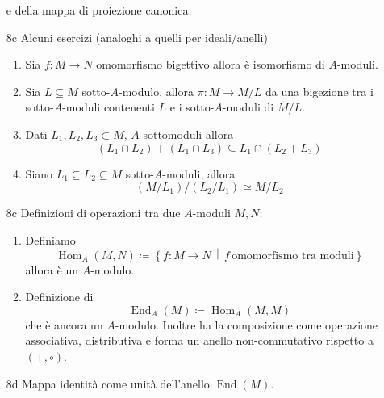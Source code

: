 \documentclass[italian]{article}
\begin{document}
\begin{enumerate}
        e della mappa di proiezione canonica.
      \item[8c] Alcuni esercizi (analoghi a quelli per ideali/anelli)
        \begin{enumerate}
            \item Sia $f \colon M \to N$ omomorfismo bigettivo allora
                è isomorfismo di $A$-moduli.
            \item Sia $L \subseteq M$ sotto-$A$-modulo, allora $\pi : M \to M/L$ da
                una bigezione tra i sotto-$A$-moduli contenenti $L$ e i 
                sotto-$A$-moduli di $M/L$.
            \item Dati $L_1,L_2,L_3 \subset M$, $A$-sottomoduli allora
              \begin{equation*}
                (L_1 \cap L_2) + (L_1 \cap L_3) \subseteq L_1 \cap (L_2 + L_3) 
              \end{equation*}
            \item Siano $L_1 \subseteq L_2 \subseteq M$ sotto-$A$-moduli, allora
              \begin{equation*}
                (M/L_1)/(L_2/L_1) \simeq M/L_2
              \end{equation*}
      \end{enumerate}
      \item[8c] Definizioni di operazioni tra due $A$-moduli $M,N$:
        \begin{enumerate}
          \item Definiamo 
            \begin{equation*}
              \operatorname{Hom}_A(M,N) \coloneqq \left\{ f \colon M \to
              N \,\middle|\, f\, \text{omomorfismo tra moduli} \right\}
          \end{equation*}
          allora è un $A$-modulo.
        \item Definizione di 
          \begin{equation*}
            \operatorname{End}_A(M) \coloneqq \operatorname{Hom}_A(M,M)
          \end{equation*}
          che è ancora un $A$-modulo. Inoltre ha la composizione come operazione
          associativa, distributiva e forma un anello non-commutativo rispetto
          a $(+, \circ)$.
        \end{enumerate}
      \item[8d] Mappa identità come unità dell'anello $\operatorname{End}(M)$.
    \end{enumerate}
\end{document}
